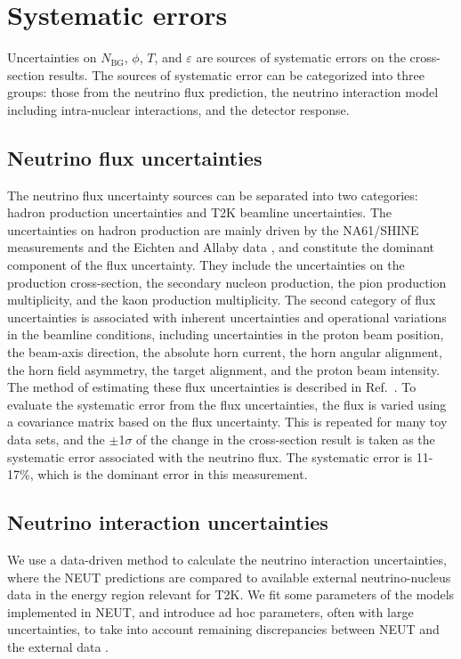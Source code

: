 \documentclass[%
 reprint,
superscriptaddress,
 amsmath,amssymb,
 aps,
]{revtex4-1}
\begin{document}
\section{Systematic errors}\label{sec:error}
Uncertainties on $N_{\mathrm{BG}}$, $\phi$, $T$, and $\varepsilon$ are sources of systematic errors on the cross-section results.
The sources of systematic error can be categorized into three groups: those from the neutrino flux prediction, the neutrino interaction model including intra-nuclear interactions, and the detector response.

\subsection{Neutrino flux uncertainties}
The neutrino flux uncertainty sources can be separated into two categories: hadron production uncertainties and T2K beamline uncertainties.
The uncertainties on hadron production are mainly
driven by the NA61/SHINE measurements \cite{na61_1, na61_2} and the
Eichten and Allaby data \cite{eichten, allaby}, and constitute the dominant
component of the flux uncertainty.
They include the uncertainties on the production cross-section, the secondary nucleon production, the pion production multiplicity, and the kaon
production multiplicity.
The second category of flux uncertainties is associated
with inherent uncertainties and operational variations in the beamline conditions, including
 uncertainties in the proton beam position, the beam-axis direction, the absolute horn
current, the horn angular alignment, the horn field
asymmetry, the target alignment, and the proton beam intensity.
The method of estimating these flux uncertainties is described in Ref.\  \cite{flux_prediction}.
To evaluate the systematic error from the flux uncertainties, the flux is varied using a covariance matrix based on the flux uncertainty.
This is repeated for many toy data sets, and the $\pm$1$\sigma$ of the change in the cross-section result is taken as the systematic error associated with the neutrino flux.
The systematic error is 11-17\%, which is the dominant error in this measurement.

\subsection{Neutrino interaction uncertainties}
We use a data-driven method to calculate the neutrino interaction uncertainties, where the NEUT predictions are compared to available external neutrino-nucleus data in the energy region relevant for T2K.
We fit some parameters of the models implemented in NEUT, and introduce ad hoc parameters, often with large uncertainties, to take into account remaining discrepancies between NEUT and the external data \cite{mb_ccpi0, mb_ccpipm, mb_ncpi0, miniboone_ccqe, nomad_ccqe, minerva_ccqe_nu, minerva_ccqe_nubar, minerva_cc1pi, k2k_coh, sciboone_coh, sciboone_nccoh, minos_ccinc}.
\end{document}
